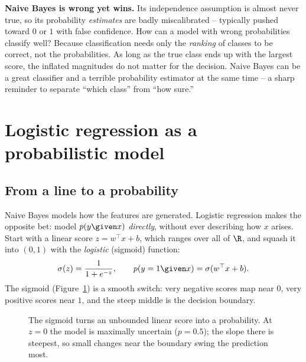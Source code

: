 \begin{paradoxbox}
\textbf{Naive Bayes is wrong yet wins.} Its independence assumption is almost
never true, so its probability \emph{estimates} are badly miscalibrated --
typically pushed toward $0$ or $1$ with false confidence. How can a model with
wrong probabilities classify well? Because classification needs only the
\emph{ranking} of classes to be correct, not the probabilities. As long as the
true class ends up with the largest score, the inflated magnitudes do not matter
for the decision. Naive Bayes can be a great classifier and a terrible
probability estimator at the same time -- a sharp reminder to separate ``which
class'' from ``how sure.''
\end{paradoxbox}

\section{Logistic regression as a probabilistic model}
\label{ch34:logistic}

\subsection{From a line to a probability}

Naive Bayes models how the features are generated. Logistic regression makes the
opposite bet: model $p(y\given x)$ \emph{directly}, without ever describing how
$x$ arises. Start with a linear score $z = w^\top x + b$, which ranges over all of
$\R$, and squash it into $(0,1)$ with the \emph{logistic} (sigmoid) function:
\[
  \sigma(z) = \frac{1}{1+e^{-z}}, \qquad
  p(y=1\given x) = \sigma(w^\top x + b).
\]
The sigmoid (Figure~\ref{ch34:fig-sigmoid}) is a smooth switch: very negative
scores map near $0$, very positive scores near $1$, and the steep middle is the
decision boundary.

\begin{figure}[H]
\centering
{}
\caption{The sigmoid turns an unbounded linear score into a probability. At
$z=0$ the model is maximally uncertain ($p=0.5$); the slope there is steepest,
so small changes near the boundary swing the prediction most.}
\label{ch34:fig-sigmoid}
\end{figure}

